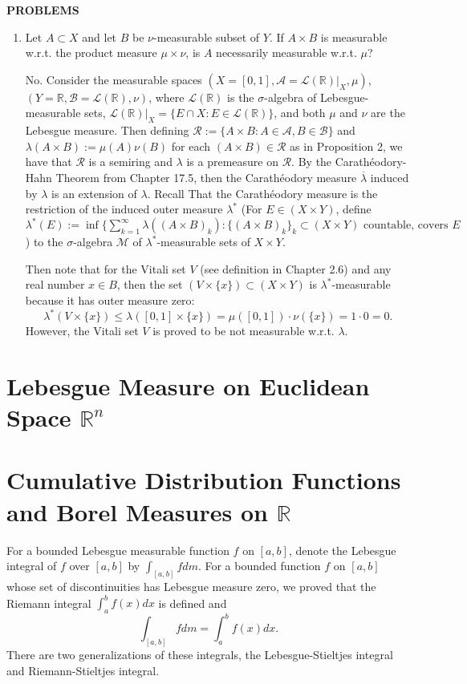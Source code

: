 \begin{center}
	\textbf{PROBLEMS}
\end{center}
\begin{enumerate}
	\setcounter{enumi}{0}
    \item Let $A\subset X$ and let $B$ be $\nu$-measurable subset of $Y$.
    If $A\times B$ is measurable w.r.t. the product measure $\mu\times\nu$, is $A$ necessarily measurable w.r.t. $\mu$?
    
    No.
    Consider the measurable spaces $(X=[0,1],\mathcal{A}=\mathcal{L}(\mathbb{R})|_X,\mu)$, $(Y=\mathbb{R},\mathcal{B}=\mathcal{L}(\mathbb{R}),\nu)$, where $\mathcal{L}(\mathbb{R})$ is the $\sigma$-algebra of Lebesgue-measurable sets, $\mathcal{L}(\mathbb{R})|_X=\{E\cap X:E\in\mathcal{L}(\mathbb{R})\}$, and both $\mu$ and $\nu$ are the Lebesgue measure.
    Then defining $\mathcal{R}:=\{A\times B:A\in\mathcal{A},B\in\mathcal{B}\}$ and $\lambda(A\times B):=\mu(A)\nu(B)$ for each $(A\times B)\in\mathcal{R}$ as in Proposition 2, we have that $\mathcal{R}$ is a semiring and $\lambda$ is a premeasure on $\mathcal{R}$.
    By the Carath\'eodory-Hahn Theorem from Chapter 17.5, then the Carath\'eodory measure $\overline\lambda$ induced by $\lambda$ is an extension of $\lambda$.
    Recall That the Carath\'eodory measure is the restriction of the induced outer measure $\lambda^*$ (For $E\in(X\times Y)$, define $\lambda^*(E):=\inf\{\sum_{k=1}^\infty\lambda((A\times B)_k):\{(A\times B)_k\}_k\subset (X\times Y)\text{ countable, covers }E $) to the $\sigma$-algebra $\mathcal{M}$ of $\lambda^*$-measurable sets of $X\times Y$.
    
    Then note that for the Vitali set $V$ (see definition in Chapter 2.6) and any real number $x\in B$, then the set $(V\times \{x\})\subset(X\times Y)$ is $\lambda^*$-measurable because it has outer measure zero: 
    \[
        \lambda^*(V\times\{x\})\le\lambda([0,1]\times\{x\})=\mu([0,1])\cdot\nu(\{x\})=1\cdot0=0.
    \]
    However, the Vitali set $V$ is proved to be not measurable w.r.t. $\lambda$.

\end{enumerate}

\section{Lebesgue Measure on Euclidean Space $\mathbb{R}^n$}

\section{Cumulative Distribution Functions and Borel Measures on $\mathbb{R}$}
For a bounded Lebesgue measurable function $f$ on $[a,b]$, denote the Lebesgue integral of $f$ over $[a,b]$ by $\int_{[a,b]}fdm$.
For a bounded function $f$ on $[a,b]$ whose set of discontinuities has Lebesgue measure zero, we proved that the Riemann integral $\int_a^bf(x)dx$ is defined and 
\[
    \int_{[a,b]}fdm=\int_a^bf(x)dx.
\]
There are two generalizations of these integrals, the Lebesgue-Stieltjes integral and Riemann-Stieltjes integral.


